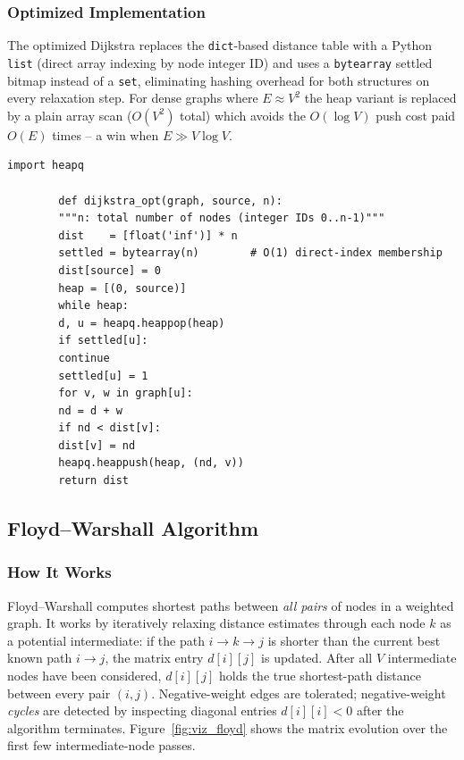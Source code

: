 \documentclass[12pt,a4paper]{article}
\begin{document}
	\subsubsection{Optimized Implementation}
	
	The optimized Dijkstra replaces the \texttt{dict}-based distance table with a
	Python \texttt{list} (direct array indexing by node integer ID) and uses a
	\texttt{bytearray} settled bitmap instead of a \texttt{set}, eliminating
	hashing overhead for both structures on every relaxation step. For dense graphs
	where $E \approx V^2$ the heap variant is replaced by a plain array scan
	($O(V^2)$ total) which avoids the $O(\log V)$ push cost paid $O(E)$ times -- a
	win when $E \gg V\log V$.
	
	\begin{lstlisting}[caption={Dijkstra (optimized) -- array-indexed distances, bytearray settled bitmap.}]
		import heapq
		
		def dijkstra_opt(graph, source, n):
		"""n: total number of nodes (integer IDs 0..n-1)"""
		dist    = [float('inf')] * n
		settled = bytearray(n)        # O(1) direct-index membership
		dist[source] = 0
		heap = [(0, source)]
		while heap:
		d, u = heapq.heappop(heap)
		if settled[u]:
		continue
		settled[u] = 1
		for v, w in graph[u]:
		nd = d + w
		if nd < dist[v]:
		dist[v] = nd
		heapq.heappush(heap, (nd, v))
		return dist
	\end{lstlisting}
	
	\subsection{Floyd--Warshall Algorithm}
	
	\subsubsection{How It Works}
	
	Floyd--Warshall computes shortest paths between \emph{all pairs} of nodes in a
	weighted graph. It works by iteratively relaxing distance estimates through each
	node $k$ as a potential intermediate: if the path $i \to k \to j$ is shorter
	than the current best known path $i \to j$, the matrix entry $d[i][j]$ is
	updated. After all $V$ intermediate nodes have been considered, $d[i][j]$ holds
	the true shortest-path distance between every pair $(i, j)$. Negative-weight
	edges are tolerated; negative-weight \emph{cycles} are detected by inspecting
	diagonal entries $d[i][i] < 0$ after the algorithm terminates.
	Figure~\ref{fig:viz_floyd} shows the matrix evolution over the first few
	intermediate-node passes.
	
\end{document}
